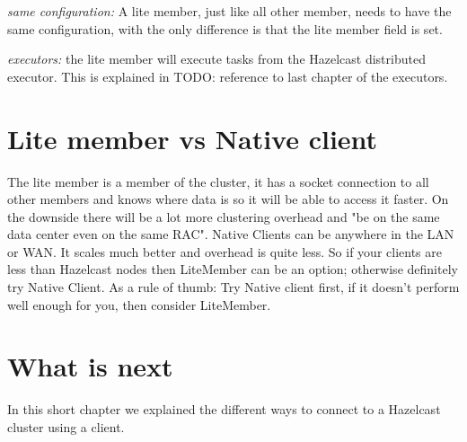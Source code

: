 \emph{same configuration:} A lite member, just like all other member, needs to have the same configuration, with the only difference is that the lite member field is set.

\emph{executors:} the lite member will execute tasks from the Hazelcast distributed executor. This is explained in TODO: reference to last chapter of the executors.

\section{Lite member vs Native client}
The lite member is a member of the cluster, it has a socket connection to all other members and knows where data is so it will be able to access it faster. On the downside there will be a lot more clustering overhead and "be on the same data center even on the same RAC". Native Clients can be anywhere in the LAN or WAN. It scales much better and overhead is quite less. So if your clients are less than Hazelcast nodes then LiteMember can be an option; otherwise definitely try Native Client. As a rule of thumb: Try Native client first, if it doesn't perform well enough for you, then consider LiteMember.

\section{What is next}
In this short chapter we explained the different ways to connect to a Hazelcast cluster using a client.